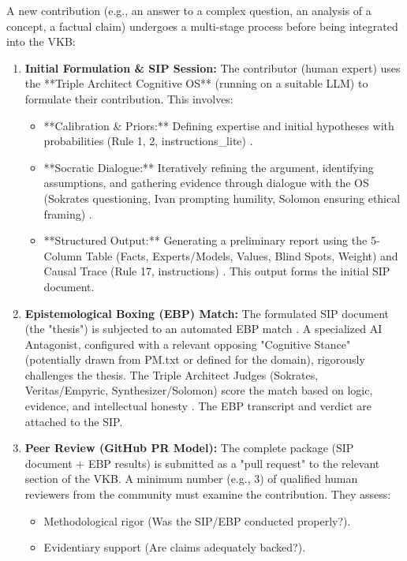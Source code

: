 \documentclass[11pt,a4paper]{article}
\theoremstyle{definition}
\theoremstyle{remark}
\begin{document}
A new contribution (e.g., an answer to a complex question, an analysis of a concept, a factual claim) undergoes a multi-stage process before being integrated into the VKB:

\begin{enumerate}
    \item \textbf{Initial Formulation \& SIP Session:} The contributor (human expert) uses the **Triple Architect Cognitive OS** (running on a suitable LLM) to formulate their contribution. This involves:
        \begin{itemize}
            \item **Calibration & Priors:** Defining expertise and initial hypotheses with probabilities (Rule 1, 2, instructions\_lite) \cite{instructions_lite}.
            \item **Socratic Dialogue:** Iteratively refining the argument, identifying assumptions, and gathering evidence through dialogue with the OS (Sokrates questioning, Ivan prompting humility, Solomon ensuring ethical framing) \cite{instructions}.
            \item **Structured Output:** Generating a preliminary report using the 5-Column Table (Facts, Experts/Models, Values, Blind Spots, Weight) and Causal Trace (Rule 17, instructions) \cite{instructions}. This output forms the initial SIP document.
        \end{itemize}
    \item \textbf{Epistemological Boxing (EBP) Match:} The formulated SIP document (the "thesis") is subjected to an automated EBP match \cite[S.V.E. 0(1)]{}. A specialized AI Antagonist, configured with a relevant opposing "Cognitive Stance" (potentially drawn from PM.txt or defined for the domain), rigorously challenges the thesis. The Triple Architect Judges (Sokrates, Veritas/Empyric, Synthesizer/Solomon) score the match based on logic, evidence, and intellectual honesty \cite[S.V.E. X]{}. The EBP transcript and verdict are attached to the SIP.
    \item \textbf{Peer Review (GitHub PR Model):} The complete package (SIP document + EBP results) is submitted as a "pull request" to the relevant section of the VKB. A minimum number (e.g., 3) of qualified human reviewers from the community must examine the contribution. They assess:
        \begin{itemize}
            \item Methodological rigor (Was the SIP/EBP conducted properly?).
            \item Evidentiary support (Are claims adequately backed?).

\end{itemize}
\end{enumerate}
\end{document}
